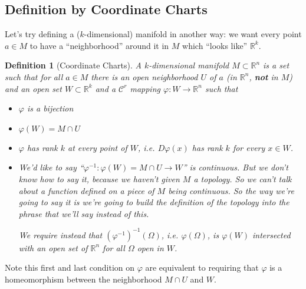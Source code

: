 \documentclass{article}
\newtheorem{definition}{Definition}
\newcommand{\reals}[0]{\mathbb{R}}
\newcommand{\mc}[1]{\mathcal{#1}}
\begin{document}
\subsection{Definition by Coordinate Charts}

Let's try defining a (\(k\)-dimensional) manifold in another way: we want every point \(a \in M\) to have a ``neighborhood'' around it in \(M\) which ``looks like'' \(\reals^k\).

\begin{definition}[Coordinate Charts]
A \(k\)-dimensional manifold \(M \subset \reals^n\) is a set such that for all \(a \in M\) there is an open neighborhood \(U\) of \(a\) (in \(\reals^n\), \textbf{not} in \(M\)) and an open set \(W \subset \reals^k\) and a \(\mc{C}^r\) mapping \(\varphi: W \to \reals^n\) such that
\begin{itemize}
  \item \(\varphi\) is a bijection
  \item \(\varphi(W) = M \cap U\)
  \item \(\varphi\) has rank \(k\) at every point of \(W\), i.e. \(D\varphi(x)\) has rank \(k\) for every \(x \in W\).
  \item We'd like to say ``\(\varphi^{-1}: \varphi(W) = M \cap U \to W\)'' is continuous. But we don't know how to say it, because we haven't given \(M\) a topology. So we can't talk about a function defined on a piece of \(M\) being continuous. So the way we're going to say it is we're going to build the definition of the topology into the phrase that we'll say instead of this.

  We require instead that
  \((\varphi^{-1})^{-1}(\Omega)\), i.e. \(\varphi(\Omega)\), is \(\varphi(W)\) intersected with an open set of \(\reals^n\) for all \(\Omega\) open in \(W\).
\end{itemize}
\label{def:manifoldbycoords}
\end{definition}
Note this first and last condition on \(\varphi\) are equivalent to requiring that \(\varphi\) is a homeomorphism between the neighborhood \(M \cap U\) and \(W\).
\end{document}
